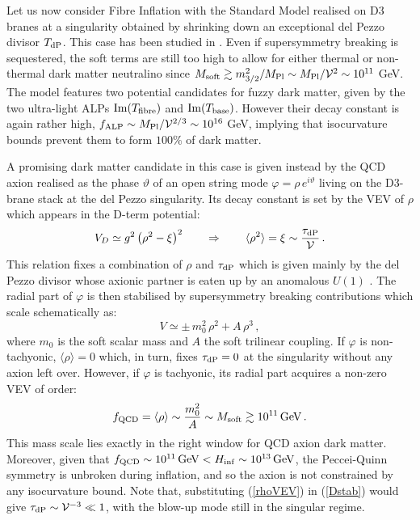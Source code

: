 \begin{itemize}
Let us now consider Fibre Inflation with the Standard Model realised on D3 branes at a singularity obtained by shrinking down an exceptional del Pezzo divisor $T_{\rm dP}$. This case has been studied in \cite{Cicoli:2022uqa}. Even if supersymmetry breaking is sequestered, the soft terms are still too high to allow for either thermal or non-thermal dark matter neutralino since $M_{\rm soft}\gtrsim m_{3/2}^2/M_{\rm Pl} \sim M_{\rm Pl}/\mathcal{V}^2 \sim 10^{11}$ GeV. The model features two potential candidates for fuzzy dark matter, given by the two ultra-light ALPs ${\rm Im}(T_{\rm fibre})$ and ${\rm Im}(T_{\rm base})$. However their decay constant is again rather high, $f_{\rm ALP}\sim M_{\rm Pl}/\mathcal{V}^{2/3}\sim 10^{16}$ GeV, implying that isocurvature bounds prevent them to form $100\%$ of dark matter. 

A promising dark matter candidate in this case is given instead by the QCD axion realised as the phase $\vartheta$ of an open string mode $\varphi = \rho\,e^{i\vartheta}$ living on the D3-brane stack at the del Pezzo singularity. Its decay constant is set by the VEV of $\rho$ which appears in the D-term potential:
\begin{equation}
V_D \simeq g^2 \left(\rho^2-\xi\right)^2 \qquad \Rightarrow \qquad \langle\rho^2\rangle = \xi \sim \frac{\tau_{\rm dP}}{\mathcal{V}}\,.
\label{Dstab}
\end{equation}
This relation fixes a combination of $\rho$ and $\tau_{\rm dP}$ which is given mainly by the del Pezzo divisor whose axionic partner is eaten up by an anomalous $U(1)$ \cite{Cicoli:2013cha}. The radial part of $\varphi$ is then stabilised by supersymmetry breaking contributions which scale schematically as:
\begin{equation}
V \simeq \pm \,m_0^2 \,\rho^2 + A \,\rho^3\,,
\end{equation}
where $m_0$ is the soft scalar mass and $A$ the soft trilinear coupling. If $\varphi$ is non-tachyonic, $\langle\rho\rangle=0$ which, in turn, fixes $\tau_{\rm dP}=0$ at the singularity without any axion left over. However, if $\varphi$ is tachyonic, its radial part acquires a non-zero VEV of order:
\begin{equation}
f_{\rm QCD} = \langle\rho\rangle \sim \frac{m_0^2}{A} \sim M_{\rm soft}\gtrsim 10^{11}\,{\rm GeV}\,.
\label{rhoVEV}
\end{equation}
This mass scale lies exactly in the right window for QCD axion dark matter. Moreover, given that $f_{\rm QCD} \sim 10^{11}\,{\rm GeV}< H_{\rm inf}\sim 10^{13}\,{\rm GeV}$, the Peccei-Quinn symmetry is unbroken during inflation, and so the axion is not constrained by any isocurvature bound. Note that, substituting (\ref{rhoVEV}) in (\ref{Dstab}) would give $\tau_{\rm dP}\sim \mathcal{V}^{-3}\ll 1$, with the blow-up mode still in the singular regime. 


\end{itemize}

